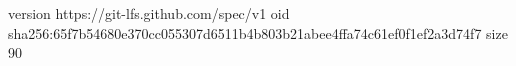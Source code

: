 version https://git-lfs.github.com/spec/v1
oid sha256:65f7b54680e370cc055307d6511b4b803b21abee4ffa74c61ef0f1ef2a3d74f7
size 90
